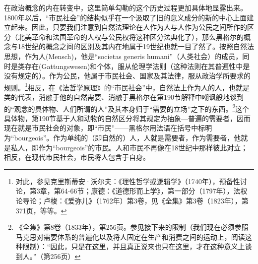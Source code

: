在政治概念的内在转变中，这里简单勾勒的这个历史过程更加具体地显露出来。1800年以后，“市民社会”的结构似乎在一个汲取了旧的意义成分的新的中心上面建立起来。因此，只要我们注意到自然法理论在人作为人与人作为公民之间所作的区分（北美革命和法国革命的人权与公民权将这种区分法典化了），那么黑格尔的概念与18世纪的概念之间的区别及其内在地属于19世纪也就一目了然了。按照自然法思想，作为人(Mensch)，他是“societas generis humani”（人类社会）的成员，同时是类存在(Gattungswesen)和个体，服从伦理学法则（这种法则在其普遍性中是没有规定的）。作为公民，他属于市民社会、国家及其法律，服从政治学所要求的规则。\footnote{对此，参见克里斯蒂安·沃尔夫：《理性哲学或逻辑学》（1740年），预备性讨论，第3章，第64-66节；康德：《道德形而上学》，第一部分（1797年），法权论导论；卢梭：《爱弥儿》（1762年）第3卷，见《全集》第3卷（1823年），第371页，等等。}相反，在《法哲学原理》的“市民社会”中，自然法上作为人的人，也就是类的代表，消融于他的自然需要、消融于黑格尔在第190节解释中嘲讽般地谈到的“观念的具体物、人们所谓的人”及其本身归于“需要的立场”之下的东西。\footnote{《全集》第8卷（1833年），第256页。参见接下来的限制（我们现在必须参照马克思对需要体系的普遍化以及将人固定在生产和消费之间的运动上，阅读这种限制）：“因此，只是在这里，并且真正说来也只在这里，才在这种意义上谈到人。”（第256页）}这个具体物，第190节基于人和动物的自然区分将其规定为抽象—普遍的需要者，因而现在就是市民社会的对象，即“市民”——黑格尔用法语在括号中标明为“bourgeois”。作为单纯的（即自然的）人，人就是需要者，作为需要者，他就是私人，即作为“bourgeois”的市民。人和市民不再像在18世纪中那样彼此对立；相反，在现代市民社会，市民将人包含于自身。


